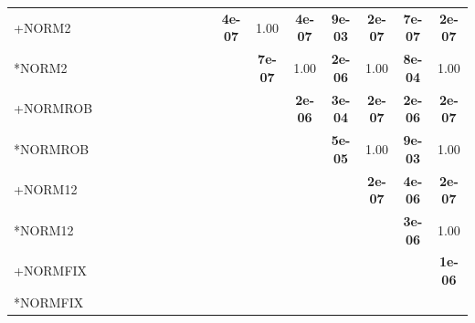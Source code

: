 \begin{table}[t]
{\begin{tabular}{lcccccccccccccccc}
+NORM2 &  &  &  &  &  &  &  &  &  & \textbf{4e-07} & 1.00 & \textbf{4e-07} & \textbf{9e-03} & \textbf{2e-07} & \textbf{7e-07} & \textbf{2e-07} \\
*NORM2 &  &  &  &  &  &  &  &  &  &  & \textbf{7e-07} & 1.00 & \textbf{2e-06} & 1.00 & \textbf{8e-04} & 1.00 \\
+NORMROB &  &  &  &  &  &  &  &  &  &  &  & \textbf{2e-06} & \textbf{3e-04} & \textbf{2e-07} & \textbf{2e-06} & \textbf{2e-07} \\
*NORMROB &  &  &  &  &  &  &  &  &  &  &  &  & \textbf{5e-05} & 1.00 & \textbf{9e-03} & 1.00 \\
+NORM12 &  &  &  &  &  &  &  &  &  &  &  &  &  & \textbf{2e-07} & \textbf{4e-06} & \textbf{2e-07} \\
*NORM12 &  &  &  &  &  &  &  &  &  &  &  &  &  &  & \textbf{3e-06} & 1.00 \\
+NORMFIX &  &  &  &  &  &  &  &  &  &  &  &  &  &  &  & \textbf{1e-06} \\
*NORMFIX &  &  &  &  &  &  &  &  &  &  &  &  &  &  &  &  \\
\bottomrule
\end{tabular}
}
\end{table}

